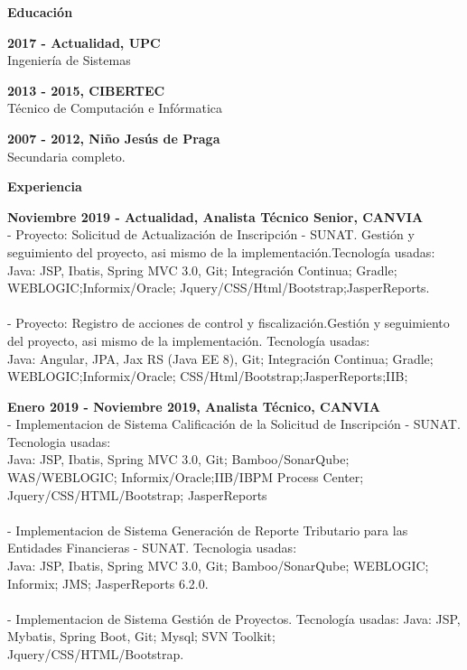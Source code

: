 \documentclass[a4paper,12pt,final]{memoir}
\newcommand{\Sep}{\vspace{1.5em}}
\newcommand{\SmallSep}{\vspace{0.5em}}
\newcommand{\CVSection}[1]
	{\Large\textbf{#1}\par
	\SmallSep\normalsize\normalfont}
\newcommand{\CVItem}[1]
	{\textbf{\color{RoyalBlue} #1}}
\begin{document}
\CVSection{Educación}
\CVItem{2017 - Actualidad, UPC}\\
Ingeniería de Sistemas
\SmallSep

\CVItem{2013 - 2015, CIBERTEC}\\
Técnico de Computación e Infórmatica
\SmallSep

\CVItem{2007 - 2012, Niño Jesús de Praga}\\
Secundaria completo.
\Sep

\CVSection{Experiencia}
\CVItem{Noviembre 2019 - Actualidad, Analista Técnico Senior, CANVIA}\\
- Proyecto: Solicitud de Actualización de Inscripción - SUNAT. Gestión y seguimiento del proyecto, asi mismo de la implementación.Tecnología usadas:\\
Java: JSP, Ibatis, Spring MVC 3.0, Git; Integración Continua; Gradle;
WEBLOGIC;Informix/Oracle; Jquery/CSS/Html/Bootstrap;JasperReports.\\\\
- Proyecto: Registro de acciones de control y fiscalización.Gestión y seguimiento del proyecto, asi mismo de la implementación. Tecnología usadas:\\
Java: Angular, JPA, Jax RS (Java EE 8), Git; Integración Continua; Gradle;
WEBLOGIC;Informix/Oracle; CSS/Html/Bootstrap;JasperReports;IIB;
\SmallSep

\CVItem{Enero 2019 - Noviembre 2019, Analista Técnico, CANVIA}\\
- Implementacion de Sistema Calificación de la Solicitud de Inscripción - SUNAT. Tecnologia usadas:\\
Java: JSP, Ibatis, Spring MVC 3.0, Git; Bamboo/SonarQube;
WAS/WEBLOGIC; Informix/Oracle;IIB/IBPM Process Center;
Jquery/CSS/HTML/Bootstrap; JasperReports\\\\
- Implementacion de Sistema Generación de Reporte Tributario para las Entidades Financieras - SUNAT. Tecnologia usadas:\\
Java: JSP, Ibatis, Spring MVC 3.0, Git; Bamboo/SonarQube; WEBLOGIC;
Informix; JMS; JasperReports 6.2.0.\\\\
- Implementacion de Sistema Gestión de Proyectos. Tecnología usadas:
Java: JSP, Mybatis, Spring Boot, Git; Mysql; SVN Toolkit;\\
Jquery/CSS/HTML/Bootstrap.
\SmallSep

\clearpage
\end{document}
